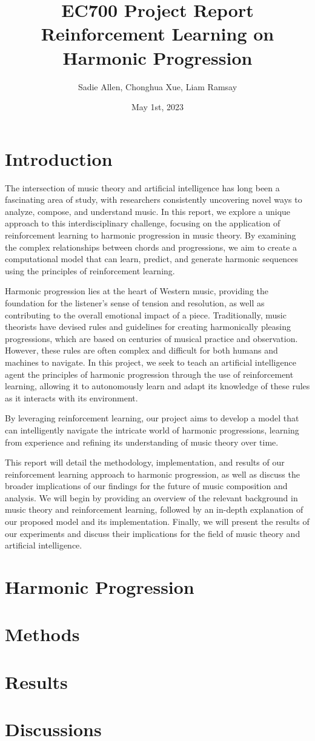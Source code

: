 \documentclass[12pt, letterpaper]{article}
\title{
    EC700 Project Report \\
    Reinforcement Learning on Harmonic Progression
}
\author{Sadie Allen, Chonghua Xue, Liam Ramsay}
\date{May 1st, 2023}
\begin{document}
\maketitle
\newpage

\section{Introduction}

The intersection of music theory and artificial intelligence has long been a fascinating area of study, with researchers consistently uncovering novel ways to analyze, compose, and understand music. In this report, we explore a unique approach to this interdisciplinary challenge, focusing on the application of reinforcement learning to harmonic progression in music theory. By examining the complex relationships between chords and progressions, we aim to create a computational model that can learn, predict, and generate harmonic sequences using the principles of reinforcement learning.

Harmonic progression lies at the heart of Western music, providing the foundation for the listener's sense of tension and resolution, as well as contributing to the overall emotional impact of a piece. Traditionally, music theorists have devised rules and guidelines for creating harmonically pleasing progressions, which are based on centuries of musical practice and observation. However, these rules are often complex and difficult for both humans and machines to navigate. In this project, we seek to teach an artificial intelligence agent the principles of harmonic progression through the use of reinforcement learning, allowing it to autonomously learn and adapt its knowledge of these rules as it interacts with its environment.

By leveraging reinforcement learning, our project aims to develop a model that can intelligently navigate the intricate world of harmonic progressions, learning from experience and refining its understanding of music theory over time.

This report will detail the methodology, implementation, and results of our reinforcement learning approach to harmonic progression, as well as discuss the broader implications of our findings for the future of music composition and analysis. We will begin by providing an overview of the relevant background in music theory and reinforcement learning, followed by an in-depth explanation of our proposed model and its implementation. Finally, we will present the results of our experiments and discuss their implications for the field of music theory and artificial intelligence.

\section{Harmonic Progression}

\section{Methods}

\section{Results}

\section{Discussions}
\end{document}
